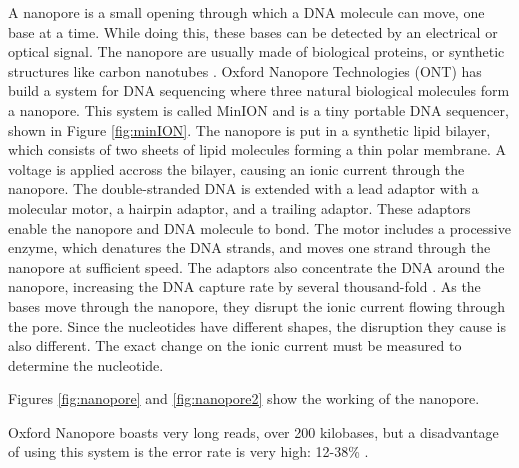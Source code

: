 \documentclass[../main/thesis.tex]{subfiles}
\begin{document}

A nanopore is a small opening through which a DNA molecule can move, one base at a time.
While doing this, these bases can be detected by an electrical or optical signal.
The nanopore are usually made of biological proteins, or synthetic structures like carbon nanotubes \cite{nanotubes}.
Oxford Nanopore Technologies (ONT) has build a system for DNA sequencing where three natural biological molecules form a nanopore.
This system is called MinION and is a tiny portable DNA sequencer, shown in Figure \ref{fig:minION}.
The nanopore is put in a synthetic lipid bilayer, which consists of two sheets of lipid molecules forming a thin polar membrane.
A voltage is applied accross the bilayer, causing an ionic current through the nanopore.
The double-stranded DNA is extended with a lead adaptor with a molecular motor, a hairpin adaptor, and a trailing adaptor.
These adaptors enable the nanopore and DNA molecule to bond.
The motor includes a processive enzyme, which denatures the DNA strands, and moves one strand through the nanopore at sufficient speed.
The adaptors also concentrate the DNA around the nanopore, increasing the DNA capture rate by several thousand-fold \cite{minION}.
As the bases move through the nanopore, they disrupt the ionic current flowing through the pore.
Since the nucleotides have different shapes, the disruption they cause is also different.
The exact change on the ionic current must be measured to determine the nucleotide.

Figures \ref{fig:nanopore} and \ref{fig:nanopore2} show the working of the nanopore.



Oxford Nanopore boasts very long reads, over 200 kilobases, but a disadvantage of using this system is the error rate is very high: 12-38\% \cite{minION_error1}\cite{minION_error2}.
\end{document}
